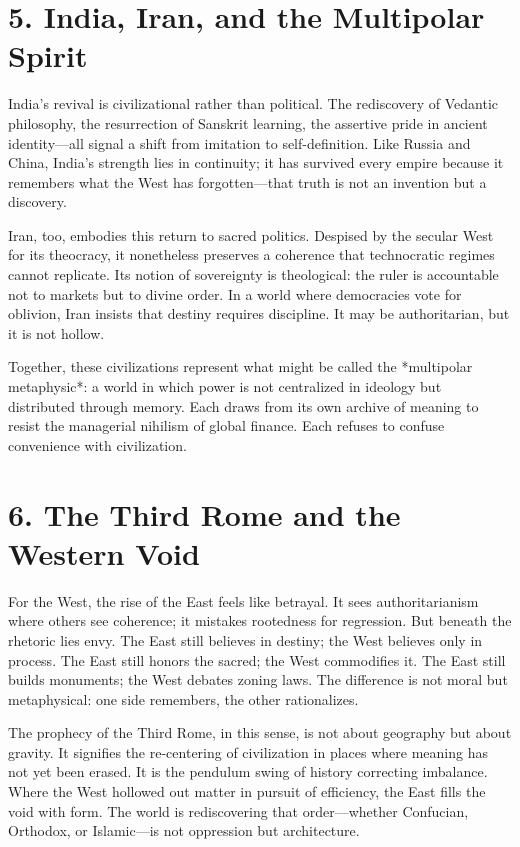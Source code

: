 \documentclass[11pt,twoside]{book}
\begin{document}
\section*{5. India, Iran, and the Multipolar Spirit}

India’s revival is civilizational rather than political.  
The rediscovery of Vedantic philosophy, the resurrection of Sanskrit learning, the assertive pride in ancient identity—all signal a shift from imitation to self-definition.  
Like Russia and China, India’s strength lies in continuity; it has survived every empire because it remembers what the West has forgotten—that truth is not an invention but a discovery.

Iran, too, embodies this return to sacred politics.  
Despised by the secular West for its theocracy, it nonetheless preserves a coherence that technocratic regimes cannot replicate.  
Its notion of sovereignty is theological: the ruler is accountable not to markets but to divine order.  
In a world where democracies vote for oblivion, Iran insists that destiny requires discipline.  
It may be authoritarian, but it is not hollow.

Together, these civilizations represent what might be called the *multipolar metaphysic*:  
a world in which power is not centralized in ideology but distributed through memory.  
Each draws from its own archive of meaning to resist the managerial nihilism of global finance.  
Each refuses to confuse convenience with civilization.

\section*{6. The Third Rome and the Western Void}

For the West, the rise of the East feels like betrayal.  
It sees authoritarianism where others see coherence; it mistakes rootedness for regression.  
But beneath the rhetoric lies envy.  
The East still believes in destiny; the West believes only in process.  
The East still honors the sacred; the West commodifies it.  
The East still builds monuments; the West debates zoning laws.  
The difference is not moral but metaphysical: one side remembers, the other rationalizes.

The prophecy of the Third Rome, in this sense, is not about geography but about gravity.  
It signifies the re-centering of civilization in places where meaning has not yet been erased.  
It is the pendulum swing of history correcting imbalance.  
Where the West hollowed out matter in pursuit of efficiency, the East fills the void with form.  
The world is rediscovering that order—whether Confucian, Orthodox, or Islamic—is not oppression but architecture.
\end{document}
